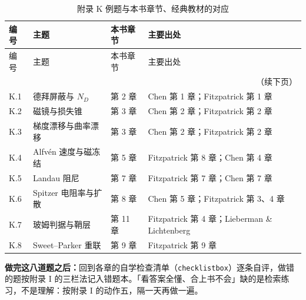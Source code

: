 \small
\begin{longtable}{@{}p{1.2cm}p{4.4cm}p{4.0cm}p{6.0cm}@{}}
\caption{附录 K 例题与本书章节、经典教材的对应}\label{tab:app-k-map}\\
\toprule
编号 & 主题 & 本书章节 & 主要出处 \\
\midrule
\endfirsthead
\toprule
编号 & 主题 & 本书章节 & 主要出处 \\
\midrule
\endhead
\midrule
\multicolumn{4}{r}{\small（续下页）}\\
\endfoot
\bottomrule
\endlastfoot
K.1 & 德拜屏蔽与 $N_D$ & 第 2 章 & Chen 第 1 章；Fitzpatrick 第 1 章 \\
K.2 & 磁镜与损失锥 & 第 3 章 & Chen 第 2 章；Fitzpatrick 第 2 章 \\
K.3 & 梯度漂移与曲率漂移 & 第 3 章 & Chen 第 2 章；Fitzpatrick 第 2 章 \\
K.4 & Alfvén 速度与磁冻结 & 第 5 章 & Fitzpatrick 第 8 章；Chen 第 4 章 \\
K.5 & Landau 阻尼 & 第 7 章 & Fitzpatrick 第 7 章；Chen 第 7 章 \\
K.6 & Spitzer 电阻率与扩散 & 第 8 章 & Chen 第 5 章；Fitzpatrick 第 3、4 章 \\
K.7 & 玻姆判据与鞘层 & 第 11 章 & Fitzpatrick 第 4 章；Lieberman \& Lichtenberg \\
K.8 & Sweet--Parker 重联 & 第 9 章 & Fitzpatrick 第 9 章 \\
\end{longtable}
\normalsize

\textbf{做完这八道题之后：}回到各章的自学检查清单（\texttt{checklistbox}）逐条自评，做错的题按附录 I 的三栏法记入错题本。「看答案全懂、合上书不会」缺的是检索练习，不是理解：按附录 I 的动作五，隔一天再做一遍。
